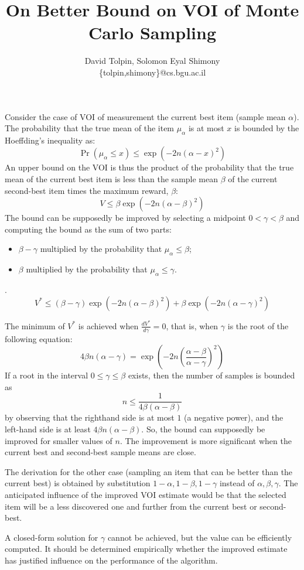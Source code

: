 \documentclass{article}
\title{On Better Bound on VOI of Monte Carlo Sampling}
\author {David Tolpin, Solomon Eyal Shimony \\
\{tolpin,shimony\}@cs.bgu.ac.il}
\begin{document}
\maketitle

Consider the case of VOI of measurement the current best item (sample mean
$\alpha$). The probability that the true mean of the item $\mu_\alpha$ is at
most $x$ is bounded by the Hoeffding's inequality as:
\[ \Pr(\mu_\alpha \le x) \le \exp\left(-2n(\alpha-x)^2\right) \]
An upper bound on the VOI is thus the product of the probability that
the true mean of the current best item is less than the sample mean
$\beta$ of the current second-best item times the maximum reward,
$\beta$:
\[ V \le \beta \exp\left(-2n(\alpha-\beta)^2\right) \]
The bound can be supposedly be improved by selecting a midpoint
$0 < \gamma < \beta$ and computing the bound as the sum of two parts:
\begin{itemize}
\item $\beta-\gamma$ multiplied by the probability that
  $\mu_\alpha \le \beta$;
\item $\beta$ multiplied by the probability that $\mu_\alpha\le
  \gamma$.
\end{itemize}.
\[ V^* \le (\beta-\gamma)\exp\left(-2n(\alpha-\beta)^2\right)+\beta\exp\left(-2n(\alpha-\gamma)^2\right) \]

\vspace{\baselineskip}

The minimum of $V^*$ is achieved when $\frac {dV^*} {d\gamma}=0$, that
is, when $\gamma$ is the root of the following equation:
\[ 4\beta n(\alpha-\gamma)=\exp\left(-2n\left(\frac {\alpha-\beta}
    {\alpha-\gamma}\right)^2\right) \]
If a root in the interval  $0\le\gamma\le\beta$ exists, then the
number of samples is bounded as
\[n\le\frac 1 {4\beta(\alpha-\beta)}\]
by observing that the righthand side 
is at most $1$ (a negative power), and the left-hand side is at least
$4\beta n(\alpha-\beta)$.
So, the bound can supposedly be improved for smaller values of
$n$. The improvement is more significant when the current best and
second-best sample means are close.

The derivation for the other case
(sampling an item that can be better than the current best) is
obtained by substitution $1-\alpha, 1-\beta, 1-\gamma$ instead of
$\alpha, \beta, \gamma$. The anticipated influence of the improved
VOI estimate would be that the selected item will be a less discovered
one and further from the current best or second-best.

A closed-form solution for $\gamma$ cannot be achieved, but the value
can be efficiently computed. It should be determined empirically
whether the improved estimate has justified influence on the
performance of the algorithm.
\end{document}
